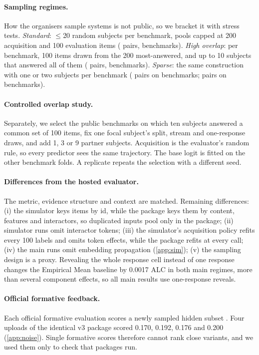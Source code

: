 \documentclass{article}
\begin{document}
\paragraph{Sampling regimes.}
How the organisers sample systems is not public, so we bracket it with stress tests.
\emph{Standard}: $\le$20 random subjects per benchmark, pools capped at 200 acquisition and 100 evaluation items (\nStd{} pairs, \nbStd{} benchmarks).
\emph{High overlap}: per benchmark, 100 items drawn from the 200 most-answered, and up to 10 subjects that answered all of them (\nHigh{} pairs, \nbHigh{} benchmarks).
\emph{Sparse}: the same construction with one or two subjects per benchmark (\nSpOne{} pairs on \nbSpOne{} benchmarks; \nSpTwo{} pairs on \nbSpTwo{} benchmarks).

\paragraph{Controlled overlap study.}
Separately, we select the \ovNb{} public benchmarks on which ten subjects answered a common set of 100 items, fix one focal subject's split, stream and one-response draws, and add 1, 3 or 9 partner subjects. Acquisition is the evaluator's random rule, so every predictor sees the same trajectory. The base logit is fitted on the other benchmark folds. A replicate repeats the selection with a different seed.

\paragraph{Differences from the hosted evaluator.}
The metric, evidence structure and context are matched. Remaining differences:
(i) the simulator keys items by id, while the package keys them by content, features and interactors, so duplicated inputs pool only in the package;
(ii) simulator runs omit interactor tokens;
(iii) the simulator's acquisition policy refits every 100 labels and omits token effects, while the package refits at every call;
(iv) the main runs omit embedding propagation (\cref{app:sim});
(v) the sampling design is a proxy.
Revealing the whole response cell instead of one response changes the Empirical Mean baseline by 0.0017 ALC in both main regimes, more than several component effects, so all main results use one-response reveals.

\paragraph{Official formative feedback.}
Each official formative evaluation scores a newly sampled hidden subset \citep{paiec2026}. Four uploads of the identical v3 package scored 0.170, 0.192, 0.176 and 0.200 (\cref{app:noise}). Single formative scores therefore cannot rank close variants, and we used them only to check that packages run.
\end{document}
